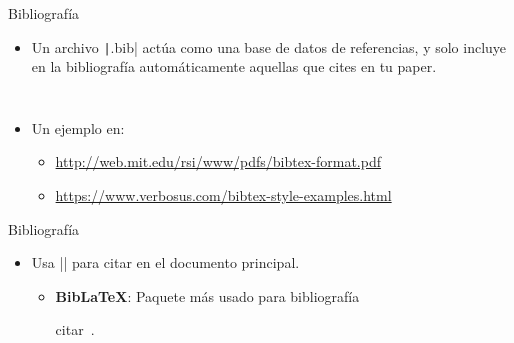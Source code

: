 \begin{frame}[fragile]{Bibliografía}
  \begin{itemize}
    \item Un archivo \texttt|.bib| actúa como una base de datos de referencias, y solo incluye en la bibliografía automáticamente aquellas que cites en tu paper.
          \begin{center}
            \begin{minipage}{0.45\linewidth}
              \inputminted[fontsize=\scriptsize]{bibtex}{./minted/article.bib}
            \end{minipage}\quad%
            \begin{minipage}{0.5\linewidth}
              \inputminted[fontsize=\scriptsize]{bibtex}{./minted/inproceedings.bib}
            \end{minipage}
          \end{center}
    \item Un ejemplo en:
          \begin{itemize}
            \item \url{http://web.mit.edu/rsi/www/pdfs/bibtex-format.pdf}
            \item \url{https://www.verbosus.com/bibtex-style-examples.html}
          \end{itemize}
  \end{itemize}
\end{frame}

\begin{frame}[fragile]{Bibliografía}
  \begin{itemize}
    \item Usa \latexinline|\cite{nameofentry}| para citar en el documento principal.
          \begin{itemize}
            \item \textbf{BibLaTeX}: Paquete más usado para bibliografía
                  \begin{latexcode}
                    \usepackage[style=ieee,giveninits=true,doi=false]{biblatex}
                    
                    
                    citar~\cite{paper}.
                    \printbibliography
                    
                  \end{latexcode}
          \end{itemize}
  \end{itemize}
\end{frame}
